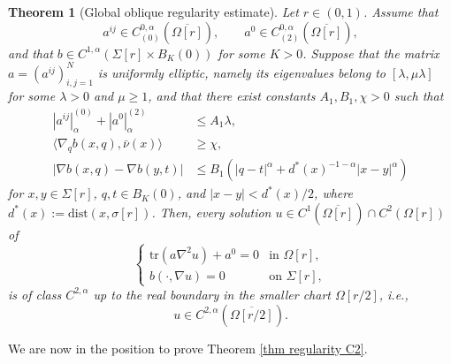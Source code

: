 \documentclass[10pt,a4paper]{amsart}
\numberwithin{equation}{section}
\newtheorem{teo}{Theorem}[section]
\begin{document}
\begin{teo}[Global oblique regularity estimate]\label{lieberman-teor}
Let $r \in (0,1)$.  Assume that
\[
    a^{ij}\in C_{(0)}^{0,\alpha}(\overline{\Omega[r]}),\qquad a^0\in C_{(2)}^{0,\alpha}(\overline{\Omega[r]}),
\]
and that $b\in C^{1,\alpha}(\Sigma[r]\times B_K(0))$ for some $K>0$.  Suppose that the matrix $a=(a^{ij})_{i,j=1}^N$ is uniformly elliptic, namely its eigenvalues belong to $[\lambda,\mu\lambda]$ for some $\lambda>0$ and $\mu\ge1$, and that there exist constants $A_1,B_1,\chi>0$ such that
\begin{align}
    |a^{ij}|_{\alpha}^{(0)}+|a^0|_{\alpha}^{(2)}&\le A_1\lambda,
    \label{teor-L1}\\
    \langle \nabla_q b(x,q), \bar{\nu}(x) \rangle &\ge \chi,
    \label{teor-L2}\\
    |\nabla b(x,q)-\nabla b(y,t)|
    &\le B_1\left(|q-t|^{\alpha}+d^\ast(x)^{-1-\alpha}|x-y|^{\alpha}\right)
    \label{teor-L3}
\end{align}
for $x,y\in\Sigma[r]$, $q,t\in B_K(0)$, and $|x-y|<d^\ast(x)/2$, where $d^\ast(x):= \mathrm{dist}(x,\sigma[r])$.  Then, every solution $u \in C^1(\overline{\Omega[r]}) \cap C^2(\Omega[r])$ of
\begin{equation*}
\begin{cases}
    \mathrm{tr} ( a \nabla^2 u) + a^0 =0 & \text{in }\Omega[r],\\
    b(\cdot , \nabla u)=0 & \text{on }\Sigma[r],
\end{cases}
\end{equation*}
is of class $C^{2,\alpha}$ up to the real boundary in the smaller chart $\Omega[r/2]$, i.e.,
\[
    u\in C^{2,\alpha}\left(\overline{\Omega[r/2]}\right).
\]
\end{teo}

We are now in the position to prove Theorem \ref{thm regularity C2}.
\end{document}
